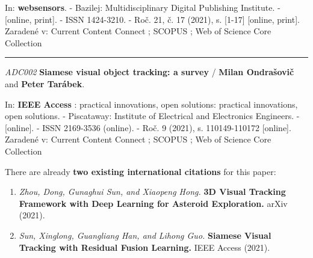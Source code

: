 \noindent In: \textbf{websensors}. - Bazilej: Multidisciplinary Digital Publishing Institute. - [online, print]. - ISSN 1424-3210. - Roč. 21, č. 17 (2021), s. [1-17] [online, print].
Zaradené v: Current Content Connect ; SCOPUS ; Web of Science Core Collection


\noindent\rule{\textwidth}{0.4pt}

\noindent \textit{ADC002} \textbf{Siamese visual object tracking: a survey} / \textbf{Milan Ondrašovič} and \textbf{Peter Tarábek}.

\noindent In: \textbf{IEEE Access} : practical innovations, open solutions: practical innovations, open solutions. - Piscataway: Institute of Electrical and Electronics Engineers. - [online]. - ISSN 2169-3536 (online). - Roč. 9 (2021), s. 110149-110172 [online].
Zaradené v: Current Content Connect ; SCOPUS ; Web of Science Core Collection


There are already \textbf{two existing international citations} for this paper:
\begin{enumerate}
    \item \textit{Zhou, Dong, Gunaghui Sun, and Xiaopeng Hong.} \textbf{3D Visual Tracking Framework with Deep Learning for Asteroid Exploration.} arXiv (2021).
    \item \textit{Sun, Xinglong, Guangliang Han, and Lihong Guo.} \textbf{Siamese Visual Tracking with Residual Fusion Learning.} IEEE Access (2021).
\end{enumerate}
